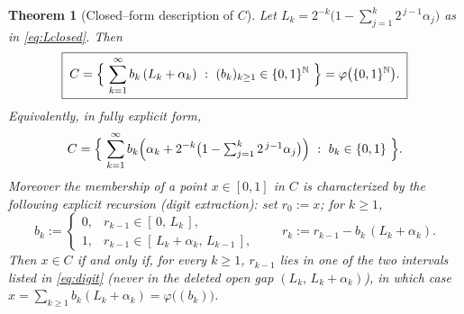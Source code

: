 \documentclass[11pt]{article}
\newtheorem{theorem}{Theorem}
\theoremstyle{definition}
\theoremstyle{remark}
\begin{document}
\begin{theorem}[Closed--form description of $C$]\label{thm:main}
Let $L_k=2^{-k}\bigl(1-\sum_{j=1}^{k}2^{\,j-1}\alpha_j\bigr)$ as in
\eqref{eq:Lclosed}. Then
\begin{equation}\label{eq:Cclosed}
\boxed{\;
C=\Bigl\{\ \sum_{k=1}^{\infty} b_k\,(L_k+\alpha_k)\ :\ (b_k)_{k\ge1}\in\{0,1\}^{\mathbb N}\ \Bigr\}
=\varphi\bigl(\{0,1\}^{\mathbb N}\bigr).\;}
\end{equation}
Equivalently, in fully explicit form,
\begin{equation}\label{eq:Cexplicit}
C=\Bigl\{\ \sum_{k=1}^{\infty} b_k\Bigl(\alpha_k+2^{-k}\bigl(1-\textstyle\sum_{j=1}^{k}2^{\,j-1}\alpha_j\bigr)\Bigr)\ :\ b_k\in\{0,1\}\ \Bigr\}.
\end{equation}
Moreover the membership of a point $x\in[0,1]$ in $C$ is characterized by the
following explicit recursion (digit extraction): set $r_0:=x$; for $k\ge1$,
\begin{equation}\label{eq:digit}
b_k:=\begin{cases}0,& r_{k-1}\in[\,0,\,L_k\,],\\[2pt] 1,& r_{k-1}\in[\,L_k+\alpha_k,\,L_{k-1}\,],\end{cases}
\qquad r_k:=r_{k-1}-b_k\,(L_k+\alpha_k).
\end{equation}
Then $x\in C$ if and only if, for every $k\ge1$, $r_{k-1}$ lies in one of the two
intervals listed in \eqref{eq:digit} (never in the deleted open gap
$(L_k,\,L_k+\alpha_k)$), in which case
$x=\sum_{k\ge1}b_k(L_k+\alpha_k)=\varphi\bigl((b_k)\bigr)$.
\end{theorem}
\end{document}
